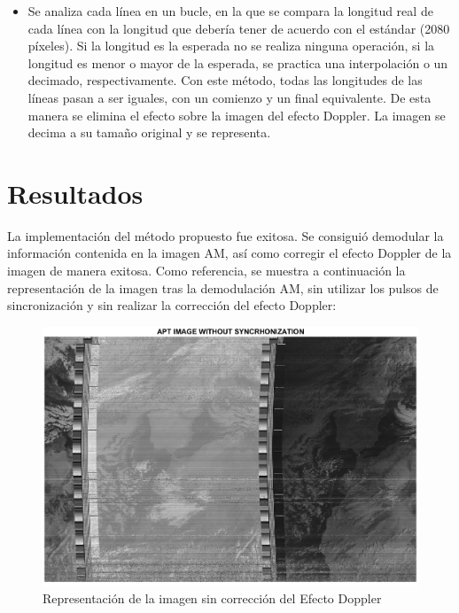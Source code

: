 \documentclass[a4paper,openright,12pt]{article}
\begin{document}
\begin{itemize}
\begin{itemize}
	\item Se analiza cada línea en un bucle, en la que se compara la longitud real de cada línea con la longitud que debería tener de acuerdo con el estándar (2080 píxeles). Si la longitud es la esperada no se realiza ninguna operación, si la longitud es menor o mayor de la esperada, se practica una interpolación o un decimado, respectivamente. Con este método, todas las longitudes de las líneas pasan a ser iguales, con un comienzo y un final equivalente. De esta manera se elimina el efecto sobre la imagen del efecto Doppler. La imagen se decima a su tamaño original y se representa.
	




\end{itemize}
	

	
	
	\end{itemize}

\section{Resultados}

La implementación del método propuesto fue exitosa. Se consiguió demodular la información contenida en la imagen AM, así como corregir el efecto Doppler de la imagen de manera exitosa. Como referencia, se muestra a continuación la representación de la imagen tras la demodulación AM, sin utilizar los pulsos de sincronización y sin realizar la corrección del efecto Doppler:


 \begin{figure}[hbtp]
 \centering
 \includegraphics[width = 15cm]{imagenes/31_01_nosynch.png}
 \caption{Representación de la imagen sin corrección del Efecto Doppler}
 \label{apt_nosynch}
 \end{figure}
 
\end{document}
